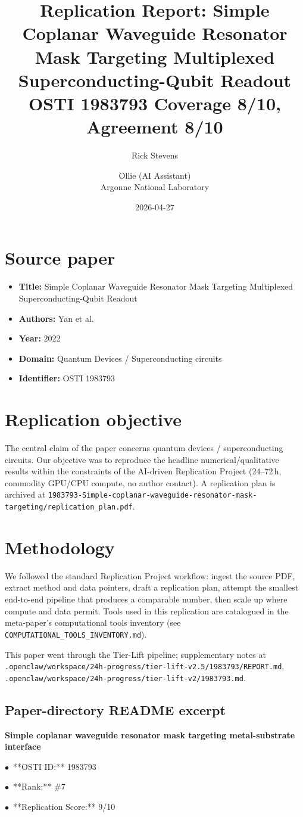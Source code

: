\documentclass[11pt]{article}
\title{Replication Report: Simple Coplanar Waveguide Resonator Mask Targeting Multiplexed Superconducting-Qubit Readout\\[2pt]\large OSTI 1983793 \textbar{} Coverage 8/10, Agreement 8/10}
\author{Rick Stevens \and Ollie (AI Assistant)\\\small Argonne National Laboratory}
\date{2026-04-27}
\begin{document}
\maketitle

\section{Source paper}
\begin{itemize}
\item \textbf{Title:} Simple Coplanar Waveguide Resonator Mask Targeting Multiplexed Superconducting-Qubit Readout
\item \textbf{Authors:} Yan et al.
\item \textbf{Year:} 2022
\item \textbf{Domain:} Quantum Devices / Superconducting circuits
\item \textbf{Identifier:} OSTI 1983793
\end{itemize}


\section{Replication objective}
The central claim of the paper concerns quantum devices / superconducting circuits. Our objective was to reproduce the headline numerical/qualitative results within the constraints of the AI-driven Replication Project (24--72\,h, commodity GPU/CPU compute, no author contact). A replication plan is archived at \texttt{1983793-Simple-coplanar-waveguide-resonator-mask-targeting/replication\_plan.pdf}.

\section{Methodology}
We followed the standard Replication Project workflow: ingest the source PDF, extract method and data pointers, draft a replication plan, attempt the smallest end-to-end pipeline that produces a comparable number, then scale up where compute and data permit. Tools used in this replication are catalogued in the meta-paper's computational tools inventory (see \texttt{COMPUTATIONAL\_TOOLS\_INVENTORY.md}).

This paper went through the Tier-Lift pipeline; supplementary notes at \texttt{.openclaw/workspace/24h-progress/tier-lift-v2.5/1983793/REPORT.md}, \texttt{.openclaw/workspace/24h-progress/tier-lift-v2/1983793.md}.

\subsection*{Paper-directory README excerpt}
\small
\par\medskip\textbf{Simple coplanar waveguide resonator mask targeting metal-substrate interface}\par
\par$\bullet$\ **OSTI ID:** 1983793
\par$\bullet$\ **Rank:** \#7
\par$\bullet$\ **Replication Score:** 9/10
\end{document}
